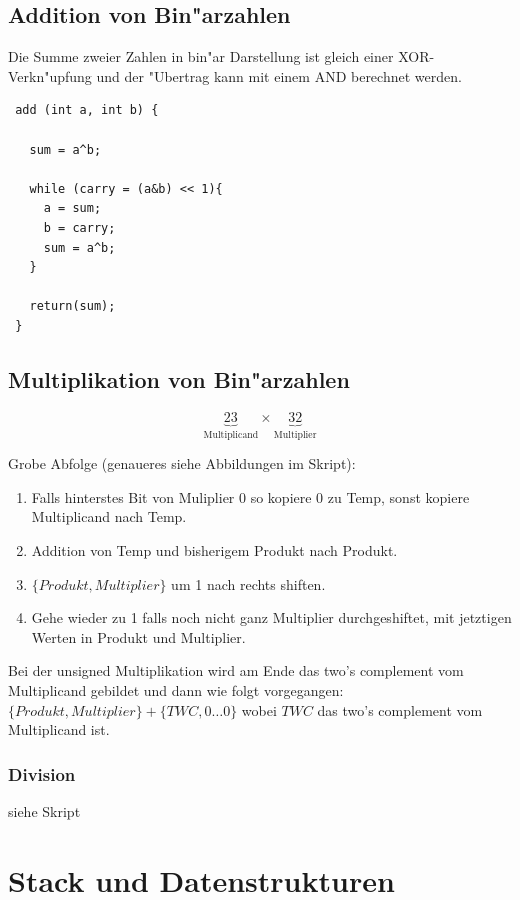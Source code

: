 \documentclass[german, 10pt, a4paper, twocolumn]{scrartcl}
\begin{document}
\subsection{Addition von Bin"arzahlen}

Die Summe zweier Zahlen in bin"ar Darstellung ist gleich einer XOR-Verkn"upfung und der "Ubertrag kann mit einem AND berechnet werden.

\begin{verbatim}
 add (int a, int b) {
   
   sum = a^b;
   
   while (carry = (a&b) << 1){
     a = sum;
     b = carry;
     sum = a^b;
   }

   return(sum);
 }
\end{verbatim}

\subsection{Multiplikation von Bin"arzahlen}

\begin{displaymath}
 \underbrace{23}_{\mbox{Multiplicand}}\times \underbrace{32}_{\mbox{Multiplier}}
\end{displaymath}

Grobe Abfolge (genaueres siehe Abbildungen im Skript):
\begin{enumerate}
	\item Falls hinterstes Bit von Muliplier 0 so kopiere 0 zu Temp, sonst kopiere Multiplicand nach Temp.
	\item Addition von Temp und bisherigem Produkt nach Produkt.
	\item $\{ Produkt,Multiplier \}$ um 1 nach rechts shiften.
	\item Gehe wieder zu 1 falls noch nicht ganz Multiplier durchgeshiftet, mit jetztigen Werten in Produkt und Multiplier.
\end{enumerate}

Bei der unsigned Multiplikation wird am Ende das two's complement vom Multiplicand gebildet und dann wie folgt vorgegangen:
$\{Produkt,Multiplier \}+\{TWC,0\ldots0 \}$ wobei $TWC$ das two's complement vom Multiplicand ist.

\subsubsection{Division}

siehe Skript

\section{Stack und Datenstrukturen}
\end{document}

